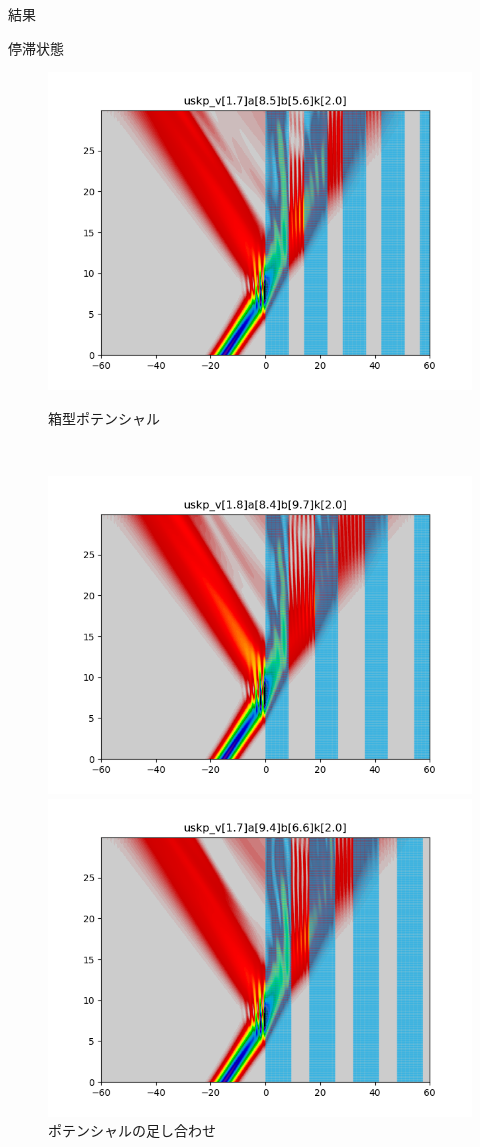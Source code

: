 \documentclass[a4paper, lualatex]{bxjsarticle}
\begin{document}
\begin{section}{結果}
\begin{subsection}{停滞状態}
\begin{figure}[h]
\begin{minipage}{0.5\hsize}
                \centering
                \includegraphics[width=0.9\hsize]{teitai2.png}
                \caption{箱型ポテンシャル}
            \end{minipage}\\
            \begin{minipage}{0.5\hsize}
                \centering
                \includegraphics[width=0.9\hsize]{teitai3.png}
                \caption{ポテンシャルの足し合わせ}
            \end{minipage}
            \begin{minipage}{0.5\hsize}
                \centering
                \includegraphics[width=0.9\hsize]{teitai4.png}

\end{minipage}
\end{figure}
\end{subsection}
\end{section}
\end{document}
